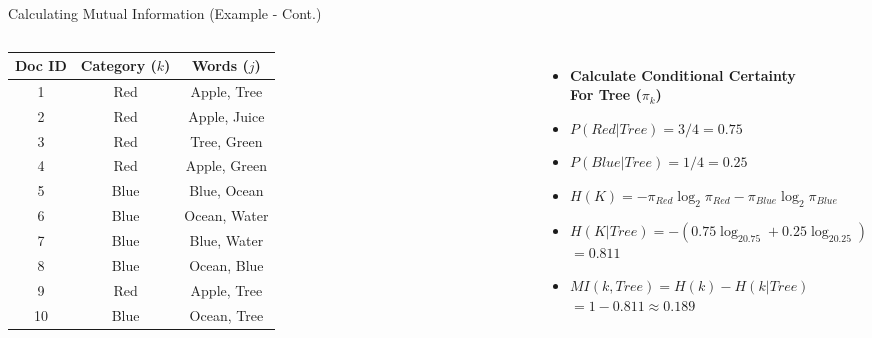 \documentclass[
  ignorenonframetext,
  aspectratio=169]{beamer}
\begin{document}
\begin{frame}{Calculating Mutual Information (Example - Cont.)}
\begin{columns}
\footnotesize
\begin{table}[h!]
\centering
\begin{tabular}{ccc}
\toprule
\textbf{Doc ID} & \textbf{Category ($k$)} & \textbf{Words ($j$)} \\ 
\midrule
 1 & Red & Apple, Tree   \\ 
 2 & Red & Apple, Juice  \\ 
 3 & Red & Tree, Green  \\ 
 4 & Red & Apple, Green  \\ 
 5 & Blue & Blue, Ocean  \\ 
 6 & Blue & Ocean, Water  \\ 
 7 & Blue & Blue, Water  \\ 
 8 & Blue & Ocean, Blue  \\ 
 9 & Red & Apple, Tree  \\ 
 10 & Blue & Ocean, Tree  \\ 
\bottomrule
\end{tabular}
\end{table}
\normalsize
{}
  \begin{itemize}
  \centering
  \item[] \hspace{2.5mm} \textbf{Calculate Conditional Certainty \\ For Tree ($\pi_{k}$)} \pause
  \item[] \hspace{2.5mm} $P(Red|Tree) = 3/4 = 0.75$
  \item[] \hspace{2.5mm} $P(Blue|Tree) = 1/4 = 0.25 $
  \item[] \hspace{2.5mm} $H(K) = -\pi_{Red}\log_2\pi_{Red}-\pi_{Blue}\log_2\pi_{Blue}$ \pause
  \vspace{2.5mm}
  \item[] \hspace{2.5mm} $H(K|Tree) = -(0.75\log_20.75+0.25\log_20.25)$ \\ $= 0.811 $
  \item[] \hspace{2.5mm} $MI(k,Tree) = H(k) - H(k|Tree)$ \\ $= 1 - 0.811 \approx 0.189 $
  \end{itemize}
  \vfill
\end{columns}
\end{frame}
\end{document}
